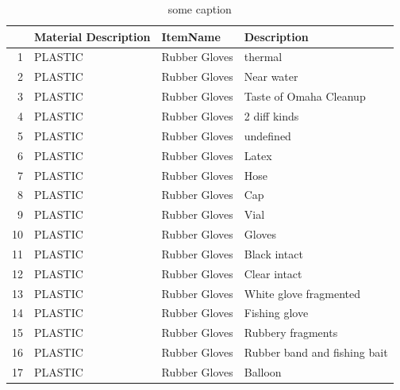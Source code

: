 \documentclass[10pt]{article}\usepackage[]{graphicx}\usepackage[]{color}
\begin{document}
\begin{table}[ht]
\centering
\begin{tabular}{rlll}
  \hline
 & Material Description & ItemName & Description \\ 
  \hline
1 & PLASTIC & Rubber Gloves & thermal \\ 
  2 & PLASTIC & Rubber Gloves & Near water \\ 
  3 & PLASTIC & Rubber Gloves & Taste of Omaha Cleanup \\ 
  4 & PLASTIC & Rubber Gloves & 2 diff kinds \\ 
  5 & PLASTIC & Rubber Gloves & undefined \\ 
  6 & PLASTIC & Rubber Gloves & Latex \\ 
  7 & PLASTIC & Rubber Gloves & Hose \\ 
  8 & PLASTIC & Rubber Gloves & Cap \\ 
  9 & PLASTIC & Rubber Gloves & Vial \\ 
  10 & PLASTIC & Rubber Gloves & Gloves \\ 
  11 & PLASTIC & Rubber Gloves & Black intact \\ 
  12 & PLASTIC & Rubber Gloves & Clear intact \\ 
  13 & PLASTIC & Rubber Gloves & White glove fragmented \\ 
  14 & PLASTIC & Rubber Gloves & Fishing glove \\ 
  15 & PLASTIC & Rubber Gloves & Rubbery fragments \\ 
  16 & PLASTIC & Rubber Gloves & Rubber band and fishing bait \\ 
  17 & PLASTIC & Rubber Gloves & Balloon \\ 
   \hline
\end{tabular}
\caption{some caption} 
\label{tab:3}
\end{table}
\end{document}
